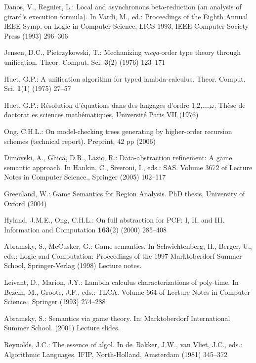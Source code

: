\documentclass{llncs}
\begin{document}
\begin{thebibliography}{10}
Danos, V., Regnier, L.:
\newblock Local and asynchronous beta-reduction (an analysis of girard's
  execution formula).
\newblock In Vardi, M., ed.: Proceedings of the Eighth Annual IEEE Symp. on
  Logic in Computer Science, {LICS} 1993, IEEE Computer Society Press (1993)
  296--306

Jensen, D.C., Pietrzykowski, T.:
\newblock Mechanizing {\it mega}-order type theory through unification.
\newblock Theor. Comput. Sci. \textbf{3}(2) (1976)  123--171

Huet, G.P.:
\newblock A unification algorithm for typed lambda-calculus.
\newblock Theor. Comput. Sci. \textbf{1}(1) (1975)  27--57

Huet, G.P.:
\newblock R{\'e}solution d'{\'e}quations dans des langages d'ordre
  1,2,...,$\omega$.
\newblock Th{\`e}se de doctorat es sciences math{\'e}matiques, Universit{\'e}
  Paris VII (1976)

Ong, C.H.L.:
\newblock On model-checking trees generating by higher-order recursion schemes
  (technical report).
\newblock Preprint, 42 pp (2006)

Dimovski, A., Ghica, D.R., Lazic, R.:
\newblock Data-abstraction refinement: A game semantic approach.
\newblock In Hankin, C., Siveroni, I., eds.: SAS. Volume 3672 of Lecture Notes
  in Computer Science., Springer (2005)  102--117

Greenland, W.:
\newblock Game Semantics for Region Analysis.
\newblock PhD thesis, University of Oxford (2004)

Hyland, J.M.E., Ong, C.H.L.:
\newblock On full abstraction for {PCF}: {I, II, and III}.
\newblock Information and Computation \textbf{163}(2) (2000)  285--408

Abramsky, S., McCusker, G.:
\newblock Game semantics.
\newblock In Schwichtenberg, H., Berger, U., eds.: Logic and Computation:
  Proceedings of the 1997 Marktoberdorf Summer School, Springer-Verlag (1998)
  Lecture notes.

Leivant, D., Marion, J.Y.:
\newblock Lambda calculus characterizations of poly-time.
\newblock In Bezem, M., Groote, J.F., eds.: TLCA. Volume 664 of Lecture Notes
  in Computer Science., Springer (1993)  274--288

Abramsky, S.:
\newblock Semantics via game theory.
\newblock In: Marktoberdorf International Summer School. (2001) Lecture slides.

Reynolds, J.C.:
\newblock The essence of algol.
\newblock In de~Bakker, J.W., van Vliet, J.C., eds.: Algorithmic Languages.
\newblock IFIP, North-Holland, Amsterdam (1981)  345--372

\end{thebibliography}
\end{document}
